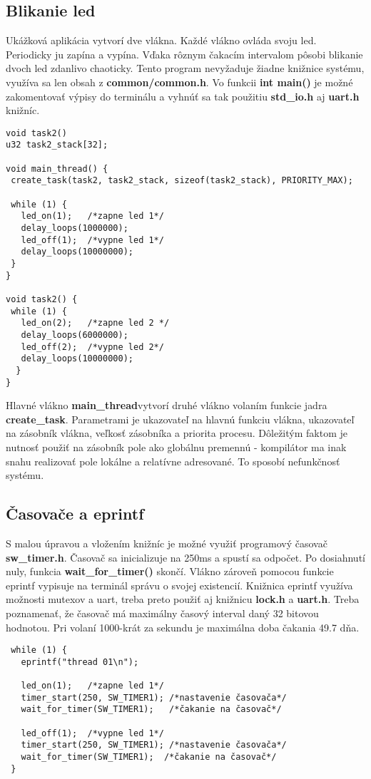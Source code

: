 \subsection{Blikanie led}
Ukážková aplikácia vytvorí dve vlákna. Každé vlákno ovláda svoju led. Periodicky ju zapína a vypína. Vďaka rôznym čakacím intervalom pôsobi blikanie dvoch led zdanlivo chaoticky. Tento program nevyžaduje žiadne knižnice systému, využíva sa len obsah z \textbf{common/common.h}. Vo funkcii \textbf{int main()} je možné zakomentovať výpisy do terminálu a vyhnúť sa tak použitiu \textbf{std\_io.h} aj \textbf{uart.h} knižníc.
{\small
\begin{verbatim}
void task2()
u32 task2_stack[32];

void main_thread() {
 create_task(task2, task2_stack, sizeof(task2_stack), PRIORITY_MAX);

 while (1) {
   led_on(1);	/*zapne led 1*/
   delay_loops(1000000);
   led_off(1);	/*vypne led 1*/
   delay_loops(10000000);
 }
}

void task2() {
 while (1) {
   led_on(2);	/*zapne led 2 */
   delay_loops(6000000);
   led_off(2);	/*vypne led 2*/
   delay_loops(10000000);
  }
}
\end{verbatim}
}

Hlavné vlákno \textbf{main\_thread}vytvorí druhé vlákno volaním funkcie jadra \textbf{create\_task}. Parametrami je ukazovateľ na hlavnú funkciu vlákna, ukazovateľ na zásobník vlákna, veľkosť zásobníka a priorita procesu. Dôležitým faktom je nutnosť použiť na zásobník pole ako globálnu premennú - kompilátor ma inak snahu realizovať pole lokálne a relatívne adresované. To sposobí nefunkčnosť systému.


\subsection{Časovače a eprintf}
S malou úpravou a vložením knižníc je možné využiť programový časovač \textbf{sw\_timer.h}. Časovač sa inicializuje na 250ms a spustí sa odpočet. Po dosiahnutí nuly, funkcia \textbf{wait\_for\_timer()} skončí. Vlákno zároveň pomocou funkcie eprintf vypisuje na terminál správu o svojej existencií. Knižnica eprintf využíva možnosti mutexov a uart, treba preto použiť aj knižnicu \textbf{lock.h} a \textbf{uart.h}. Treba poznamenať, že časovač má maximálny časový interval daný 32 bitovou hodnotou. Pri volaní 1000-krát za sekundu je maximálna doba čakania 49.7 dňa.

{\small
\begin{verbatim}
 while (1) {
   eprintf("thread 01\n");

   led_on(1);	/*zapne led 1*/
   timer_start(250, SW_TIMER1);	/*nastavenie časovača*/
   wait_for_timer(SW_TIMER1);   /*čakanie na časovač*/

   led_off(1);	/*vypne led 1*/
   timer_start(250, SW_TIMER1);	/*nastavenie časovača*/
   wait_for_timer(SW_TIMER1);  /*čakanie na časovač*/
 }
\end{verbatim}
}

